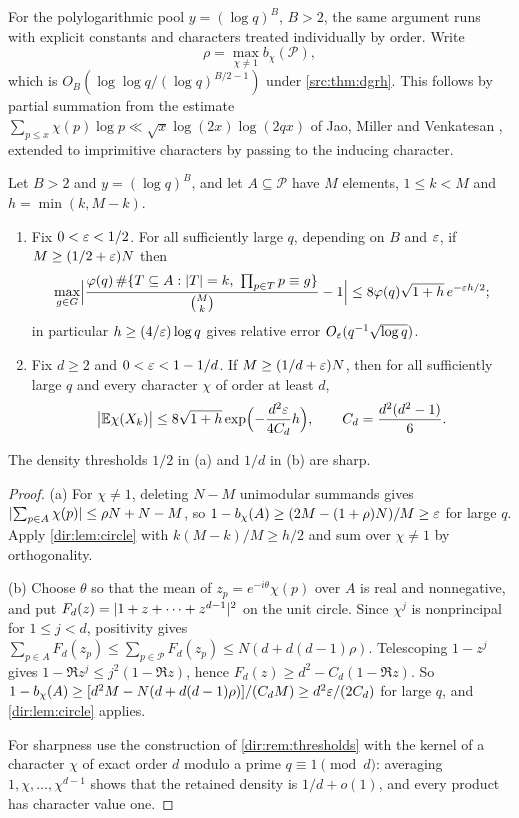 For the polylogarithmic pool $y=(\log q)^B$, $B>2$, the same argument runs with explicit
constants and characters treated individually by order. Write
\[
 \rho=\max_{\chi\ne1}b_\chi(\mathcal P),
\]
which is $O_B(\log\log q/(\log q)^{B/2-1})$ under \cref{src:thm:dgrh}. This follows by
partial summation from the estimate
$\sum_{p\le x}\chi(p)\log p\ll\sqrt x\log(2x)\log(2qx)$ of Jao, Miller and Venkatesan
\cite[proof of Theorem~1.1, (2.6)]{JaoMillerVenkatesan2009Expander}, extended to imprimitive
characters by passing to the inducing character.

\begin{proposition}\label{dir:prop:explicit}
Let $B>2$ and $y=(\log q)^B$, and let $A\subseteq\mathcal P$ have $M$ elements, $1\le k<M$ and
$h=\min(k,M-k)$.
\begin{enumerate}[label=\textup{(\alph*)}]
\item Fix $0<\varepsilon<1/2$. For all sufficiently large $q$, depending on $B$ and $\varepsilon$, if
$M\ge(1/2+\varepsilon)N$ then
\[
 \max_{g\in G}\Bigl|\frac{\varphi(q)\,\#\{T\subseteq A:\lvert T\rvert=k,\ \prod_{p\in T}p\equiv g\}}
 {\binom Mk}-1\Bigr|\le8\varphi(q)\sqrt{1+h}\,e^{-\varepsilon h/2};
\]
in particular $h\ge(4/\varepsilon)\log q$ gives relative error $O_\varepsilon(q^{-1}\sqrt{\log q})$.
\item Fix $d\ge2$ and $0<\varepsilon<1-1/d$. If $M\ge(1/d+\varepsilon)N$, then for all sufficiently large $q$
and every character $\chi$ of order at least $d$,
\[
 \bigl|\mathbb{E}\chi(X_k)\bigr|\le8\sqrt{1+h}\exp\Bigl(-\frac{d^2\varepsilon}{4C_d}h\Bigr),\qquad
 C_d=\frac{d^2(d^2-1)}6 .
\]
\end{enumerate}
The density thresholds $1/2$ in \textup{(a)} and $1/d$ in \textup{(b)} are sharp.
\end{proposition}

\begin{proof}
(a) For $\chi\ne1$, deleting $N-M$ unimodular summands gives
$\lvert\sum_{p\in A}\chi(p)\rvert\le\rho N+N-M$, so $1-b_\chi(A)\ge(2M-(1+\rho)N)/M\ge\varepsilon$ for large
$q$. Apply \cref{dir:lem:circle} with $k(M-k)/M\ge h/2$ and sum over $\chi\ne1$ by orthogonality.

(b) Choose $\theta$ so that the mean of $z_p=e^{-i\theta}\chi(p)$ over $A$ is real and
nonnegative, and put $F_d(z)=\lvert1+z+\dots+z^{d-1}\rvert^2$ on the unit circle. Since $\chi^j$ is
nonprincipal for $1\le j<d$, positivity gives
$\sum_{p\in A}F_d(z_p)\le\sum_{p\in\mathcal P}F_d(z_p)\le N(d+d(d-1)\rho)$. Telescoping $1-z^j$
gives $1-\Re z^j\le j^2(1-\Re z)$, hence $F_d(z)\ge d^2-C_d(1-\Re z)$. So
$1-b_\chi(A)\ge[d^2M-N(d+d(d-1)\rho)]/(C_dM)\ge d^2\varepsilon/(2C_d)$ for large $q$, and
\cref{dir:lem:circle} applies.

For sharpness use the construction of \cref{dir:rem:thresholds} with the kernel of a character $\chi$
of exact order $d$ modulo a prime $q\equiv1\pmod d$: averaging $1,\chi,\dots,\chi^{d-1}$ shows that the
retained density is $1/d+o(1)$, and every product has character value one.
\end{proof}

